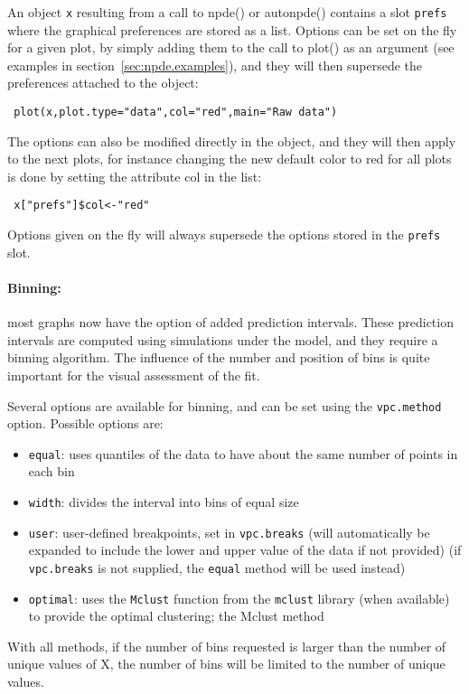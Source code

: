 \bigskip An object \texttt{x} resulting from a call to {\sf npde()} or {\sf autonpde()} contains a slot 
\texttt{prefs} where the graphical preferences are stored as a list. Options can be set on the fly for a given 
plot, by simply adding them to the call to {\sf plot()} as an argument (see examples in 
section~\ref{sec:npde.examples}), and they will then supersede the preferences attached to the object: 
\begin{verbatim} plot(x,plot.type="data",col="red",main="Raw data") \end{verbatim} The options can also be modified 
directly in the object, and they will then apply to the next plots, for instance changing the new default color to 
red for all plots is done by setting the attribute {\sf col} in the list: \begin{verbatim} x["prefs"]$col<-"red" 
\end{verbatim} Options given on the fly will always supersede the options stored in the \texttt{prefs} slot.

\paragraph{Binning:} most graphs now have the option of added prediction intervals. These prediction intervals are 
computed using simulations under the model, and they require a binning algorithm. The influence of the number and 
position of bins is quite important for the visual assessment of the fit.

Several options are available for binning, and can be set using the \texttt{vpc.method} option. Possible options 
are: \begin{itemize} \item \texttt{equal}: uses quantiles of the data to have about the same number of points in 
each bin \item \texttt{width}: divides the interval into bins of equal size \item \texttt{user}: user-defined 
breakpoints, set in \texttt{vpc.breaks} (will automatically be expanded to include the lower and upper value of the 
data if not provided) (if \texttt{vpc.breaks} is not supplied, the \texttt{equal} method will be used instead) 
\item \texttt{optimal}: uses the \texttt{Mclust} function from the \texttt{mclust} library (when available) to 
provide the optimal clustering; the Mclust method \end{itemize} With all methods, if the number of bins requested 
is larger than the number of unique values of X, the number of bins will be limited to the number of unique values.

